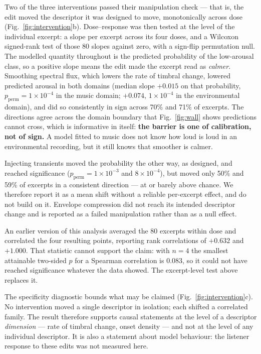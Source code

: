 Two of the three interventions passed their manipulation check --- that is, the
edit moved the descriptor it was designed to move, monotonically across dose
(Fig.~\ref{fig:intervention}b). Dose--response was then tested at the level of the
individual excerpt: a slope per excerpt across its four doses, and a Wilcoxon
signed-rank test of those 80 slopes against zero, with a sign-flip permutation
null. The modelled quantity throughout is the predicted probability of the
low-arousal class, so a positive slope means the edit made the excerpt read as
\emph{calmer}. Smoothing spectral flux, which lowers the rate of timbral change,
lowered predicted arousal in both domains (median slope $+0.015$ on that
probability, $p_{\text{perm}} = 1\times10^{-4}$ in the music domain; $+0.074$,
$1\times10^{-4}$ in the environmental domain), and did so consistently in sign
across 70\% and 71\% of excerpts. The directions agree across the domain boundary
that Fig.~\ref{fig:wall} shows predictions cannot cross, which is informative in
itself: \textbf{the barrier is one of calibration, not of sign.} A model fitted to
music does not know how loud is loud in an environmental recording, but it still
knows that smoother is calmer.

Injecting transients moved the probability the other way, as designed, and reached
significance ($p_{\text{perm}} = 1\times10^{-3}$ and $8\times10^{-4}$), but moved
only 50\% and 59\% of excerpts in a consistent direction --- at or barely above
chance. We therefore report it as a mean shift without a reliable per-excerpt
effect, and do not build on it. Envelope compression did not reach its intended
descriptor change and is reported as a failed manipulation rather than as a null
effect.

An earlier version of this analysis averaged the 80 excerpts within dose and
correlated the four resulting points, reporting rank correlations of $+0.632$ and
$+1.000$. That statistic cannot support the claim: with $n = 4$ the smallest
attainable two-sided $p$ for a Spearman correlation is $0.083$, so it could not
have reached significance whatever the data showed. The excerpt-level test above
replaces it.

The specificity diagnostic bounds what may be claimed
(Fig.~\ref{fig:intervention}c). No intervention moved a single descriptor in
isolation; each shifted a correlated family. The result therefore supports
causal statements at the level of a descriptor \emph{dimension} --- rate of
timbral change, onset density --- and not at the level of any individual
descriptor. It is also a statement about model behaviour: the listener response
to these edits was not measured here.

